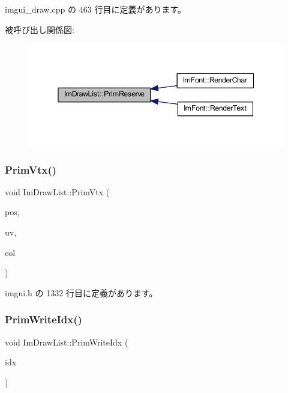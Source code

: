  imgui\+\_\+draw.\+cpp の 463 行目に定義があります。

被呼び出し関係図\+:\nopagebreak
\begin{figure}[H]
\begin{center}
\leavevmode
\includegraphics[width=345pt]{struct_im_draw_list_a879aa38dbfb0344e3e023d65c002c7d7_icgraph}
\end{center}
\end{figure}
\mbox{\label{struct_im_draw_list_a405377158f0028ad8b4fb6509eef4532}} 
\subsubsection{\texorpdfstring{Prim\+Vtx()}{PrimVtx()}}
{\footnotesize\ttfamily void Im\+Draw\+List\+::\+Prim\+Vtx (\begin{DoxyParamCaption}\item[{const \mbox{\hyperlink{struct_im_vec2}{Im\+Vec2}} \&}]{pos,  }\item[{const \mbox{\hyperlink{struct_im_vec2}{Im\+Vec2}} \&}]{uv,  }\item[{\mbox{\hyperlink{imgui_8h_a118cff4eeb8d00e7d07ce3d6460eed36}{Im\+U32}}}]{col }\end{DoxyParamCaption})\hspace{0.3cm}{\ttfamily [inline]}}



 imgui.\+h の 1332 行目に定義があります。

\mbox{\label{struct_im_draw_list_a42b72f87a0084c02f11dcd1560c8bbc7}} 
\subsubsection{\texorpdfstring{Prim\+Write\+Idx()}{PrimWriteIdx()}}
{\footnotesize\ttfamily void Im\+Draw\+List\+::\+Prim\+Write\+Idx (\begin{DoxyParamCaption}\item[{\mbox{\hyperlink{imgui_8h_afdc8744a5ac1a968b1ddfa47e13b2fa1}{Im\+Draw\+Idx}}}]{idx }\end{DoxyParamCaption})\hspace{0.3cm}{\ttfamily [inline]}}



